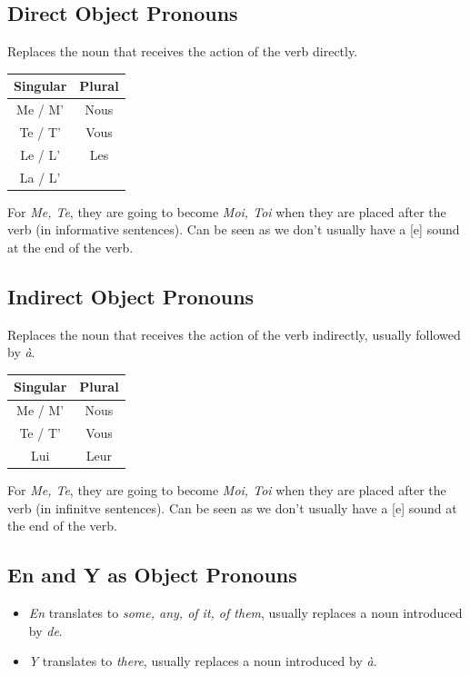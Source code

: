 \documentclass{book}
\begin{document}
\subsection{Direct Object Pronouns}
Replaces the noun that receives the action of the verb directly.
\begin{center}
    \begin{tabular}{|c|c|}
        \hline
        \textbf{Singular} & \textbf{Plural} \\
        \hline
        Me / M' & Nous \\
        \hline
        Te / T' & Vous \\
        \hline
        Le / L' & Les \\
        \hline
        La / L' & \\
        \hline
    \end{tabular}
\end{center}
For \textit{Me, Te}, they are going to become \textit{Moi, Toi} when they are placed after the verb (in informative sentences). Can be seen as we don't usually have a [e] sound at the end of the verb.

\subsection{Indirect Object Pronouns}
Replaces the noun that receives the action of the verb indirectly, usually followed by \textit{à}.
\begin{center}
    \begin{tabular}{|c|c|}
        \hline
        \textbf{Singular} & \textbf{Plural} \\
        \hline
        Me / M' & Nous \\
        \hline
        Te / T' & Vous \\
        \hline
        Lui & Leur \\
        \hline
    \end{tabular}
\end{center}
For \textit{Me, Te}, they are going to become \textit{Moi, Toi} when they are placed after the verb (in infinitve sentences). Can be seen as we don't usually have a [e] sound at the end of the verb.

\subsection{En and Y as Object Pronouns}
\begin{itemize}
    \item \textit{En} translates to \textit{some, any, of it, of them}, usually replaces a noun introduced by \textit{de}.
    \item \textit{Y} translates to \textit{there}, usually replaces a noun introduced by \textit{à}.
\end{itemize}
\end{document}
